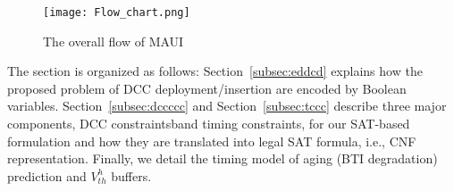 
\begin{comment}
The basic idea of our MAUI framework for aging tolerance is to insert \textit{duty-cycle converters} (DCCs) in the existing clock tree, so as to intentionally create aging-induced clock skews which can compensate for the performance degradation of the logic circuit based on time borrowing. We formulate the problem using Boolean satisfiability (SAT) and thanks to the efficiency of existing SAT solvers, the optimal solution can be obtained efficiently. The end result of this formulation is the locations (in the existing clock tree) to insert DCCs such that, when aging-induced clock skews are considered, the required clock period of the given circuit under $n$-year BTI is minimized. Note that the clock period can be minimized since the performance degradation of the logic circuit is \enquote{tolerated} as a result of useful aging-induced clock skews. The minimum required clock period thus implies maximum level of aging tolerance.
\end{comment}

\begin{figure}
	\centering
	\texttt{[image: Flow\_chart.png]}
	\caption{The overall flow of MAUI}
	\label{fig:flow}
\end{figure}
 

The section is organized as follows: Section~\ref{subsec:eddcd} explains how the proposed problem of DCC deployment/insertion are encoded by Boolean variables. Section~\ref{subsec:dccccc} and Section~\ref{subsec:tccc} describe three major components, DCC constraintsband timing constraints, for our SAT-based formulation and how they are translated into legal SAT formula, i.e., CNF representation. Finally, we detail the timing model of aging (BTI degradation) prediction and $V_{th}^h$ buffers.

